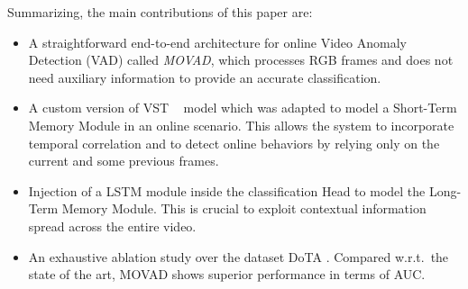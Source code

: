 Summarizing, the main contributions of this paper are:
\begin{itemize}%
    \item A straightforward end-to-end architecture for online Video Anomaly Detection (VAD) called \emph{MOVAD}, which processes RGB frames and does not need auxiliary information to provide an accurate classification.
    \item A custom version of VST ~\cite{liu_video_2022} model which was adapted to model a Short-Term Memory Module in an online scenario.
    This allows the system to incorporate temporal correlation and to detect online behaviors by relying only on the current and some previous frames.
    \item Injection of a LSTM module inside the classification Head to model the Long-Term Memory Module.
    This is crucial to exploit contextual information spread across the entire video.
    \item An exhaustive ablation study over the dataset DoTA \cite{9712446}.
    Compared w.r.t.~the state of the art, MOVAD shows superior performance in terms of AUC.
\end{itemize}